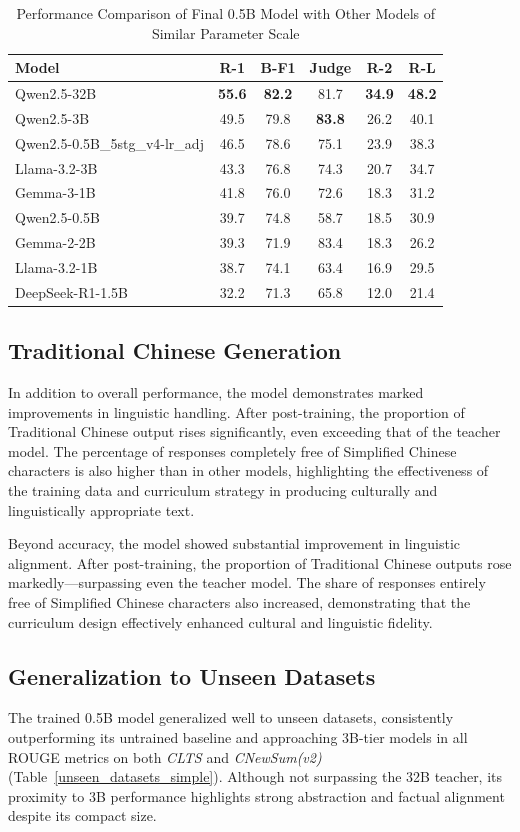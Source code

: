 \documentclass[preprint,12pt]{elsarticle}
\begin{document}
\begin{table}[t]
\caption{Performance Comparison of Final 0.5B Model with Other Models of Similar Parameter Scale}
\label{tab:final_05B_comparison}
\centering
\begin{tabular}{lccccc}
\hline
Model & R-1 & B-F1 & Judge & R-2 & R-L \\
\hline
Qwen2.5-32B & \textbf{55.6} & \textbf{82.2} & 81.7 & \textbf{34.9} & \textbf{48.2} \\
Qwen2.5-3B & 49.5 & 79.8 & \textbf{83.8} & 26.2 & 40.1 \\
Qwen2.5-0.5B\_5stg\_v4-lr\_adj & 46.5 & 78.6 & 75.1 & 23.9 & 38.3 \\
Llama-3.2-3B & 43.3 & 76.8 & 74.3 & 20.7 & 34.7 \\
Gemma-3-1B & 41.8 & 76.0 & 72.6 & 18.3 & 31.2 \\
Qwen2.5-0.5B & 39.7 & 74.8 & 58.7 & 18.5 & 30.9 \\
Gemma-2-2B & 39.3 & 71.9 & 83.4 & 18.3 & 26.2 \\
Llama-3.2-1B & 38.7 & 74.1 & 63.4 & 16.9 & 29.5 \\
DeepSeek-R1-1.5B & 32.2 & 71.3 & 65.8 & 12.0 & 21.4 \\
\hline
\end{tabular}
\end{table}

\subsection{Traditional Chinese Generation}
In addition to overall performance, the model demonstrates marked improvements in linguistic handling. After post-training, the proportion of Traditional Chinese output rises significantly, even exceeding that of the teacher model. The percentage of responses completely free of Simplified Chinese characters is also higher than in other models, highlighting the effectiveness of the training data and curriculum strategy in producing culturally and linguistically appropriate text.

Beyond accuracy, the model showed substantial improvement in linguistic alignment.  
After post-training, the proportion of Traditional Chinese outputs rose markedly—surpassing even the teacher model.  
The share of responses entirely free of Simplified Chinese characters also increased, demonstrating that the curriculum design effectively enhanced cultural and linguistic fidelity.

\subsection{Generalization to Unseen Datasets}
The trained 0.5B model generalized well to unseen datasets, consistently outperforming its untrained baseline and approaching 3B-tier models in all ROUGE metrics on both \textit{CLTS} and \textit{CNewSum(v2)} (Table~\ref{unseen_datasets_simple}).  
Although not surpassing the 32B teacher, its proximity to 3B performance highlights strong abstraction and factual alignment despite its compact size.
\end{document}
